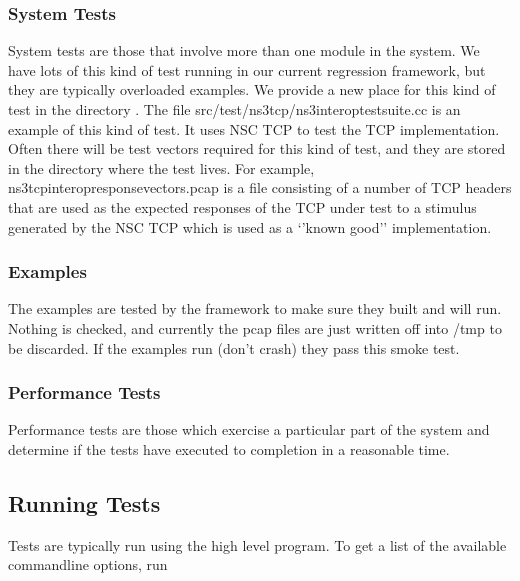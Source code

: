 \documentclass[letterpaper,10pt,english]{sphinxmanual}
\renewcommand{\sphinxcode}[1]{\texttt{\small{#1}}}
\begin{document}
\subsubsection{System Tests}
\label{\detokenize{test-framework:system-tests}}
System tests are those that involve more than one module in the system.  We
have lots of this kind of test running in our current regression framework,
but they are typically overloaded examples.  We provide a new place
for this kind of test in the directory \sphinxcode{}.  The file
src/test/ns3tcp/ns3\sphinxhyphen{}interop\sphinxhyphen{}test\sphinxhyphen{}suite.cc is an example of this kind of
test.  It uses NSC TCP to test the  TCP implementation.  Often there
will be test vectors required for this kind of test, and they are stored in
the directory where the test lives.  For example,
ns3tcp\sphinxhyphen{}interop\sphinxhyphen{}response\sphinxhyphen{}vectors.pcap is a file consisting of a number of TCP
headers that are used as the expected responses of the  TCP under test
to a stimulus generated by the NSC TCP which is used as a ‘’known good’’
implementation.


\subsubsection{Examples}
\label{\detokenize{test-framework:examples}}
The examples are tested by the framework to make sure they built and will
run.  Nothing is checked, and currently the pcap files are just written off
into /tmp to be discarded.  If the examples run (don’t crash) they pass this
smoke test.


\subsubsection{Performance Tests}
\label{\detokenize{test-framework:performance-tests}}
Performance tests are those which exercise a particular part of the system
and determine if the tests have executed to completion in a reasonable time.


\subsection{Running Tests}
\label{\detokenize{test-framework:running-tests}}
Tests are typically run using the high level \sphinxcode{} program. To get a list of the available command\sphinxhyphen{}line options, run \sphinxcode{\sphinxupquote{test.py \sphinxhyphen{}\sphinxhyphen{}help}}
\end{document}
